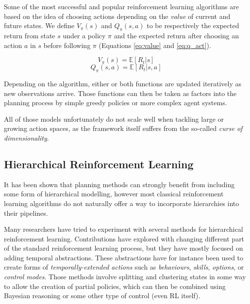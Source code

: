 Some of the most successful and popular reinforcement learning algorithms are
based on the idea of choosing actions depending on the \emph{value} of current
and future states. We define $V_{\pi}(s)$ and $Q_{\pi}(s, a)$ to be respectively
the expected return from state $s$ under a policy $\pi$ and the expected return
after choosing an action $a$ in $s$ before following $\pi$ (Equations
\ref{eq:value} and \ref{eq:q_act}).

\begin{equation}
V_{\pi}(s) = \mathbb{E}[R_t | s]
\label{eq:value}
\end{equation}
\begin{equation}
Q_{\pi}(s, a) = \mathbb{E}[R_t | s, a]
\label{eq:q_act}
\end{equation}

Depending on the algorithm, either or both functions are updated iteratively as
new observations arrive. Those functions can then be taken as factors into the
planning process by simple greedy policies or more complex agent systems.


All of those models unfortunately do not scale well when tackling large or
growing action spaces, as the framework itself suffers from the so-called
\emph{curse of dimensionality}. 

\subsection{Hierarchical Reinforcement Learning}

It has been shown that planning methods can
strongly benefit from including some form of hierarchical modelling, however
most classical reinforcement learning algorithms do not naturally offer a way to
incorporate hierarchies into their pipelines.

Many researchers have tried to experiment with several methods for hierarchical
reinforcement learning. Contributions have explored with changing different part
of the standard reinforcement learning process, but they have mostly focused on
adding temporal abstractions. These abstractions have for instance been used to
create forms of \emph{temporally-extended actions} such as 
\emph{behaviours},
\emph{skills}, 
\emph{options}, 
or \emph{control modes}.
Those methods involve splitting and clustering states in some way to allow
the creation of partial policies, which can then be combined using Bayesian
reasoning or some other type of control (even RL itself).

